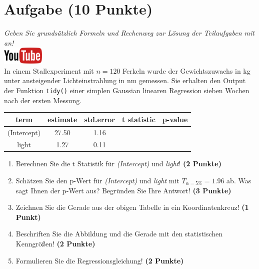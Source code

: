 \documentclass[a4paper, 10pt]{scrartcl}\usepackage[]{graphicx}\usepackage[]{xcolor}
\begin{document}
\section{Aufgabe \hfill (10 Punkte)}

\textit{Geben Sie grunds{\"a}tzlich Formeln und Rechenweg zur L{\"o}sung der
  Teilaufgaben mit an!} \\[1Ex]

\hfill\href{https://youtu.be/lJp8rFmMnrs}{\includegraphics[width =
  2cm]{img/youtube}}\\[1Ex]



In einem Stallexperiment mit $n = 120$ Ferkeln wurde der
Gewichtszuwachs in kg unter ansteigender Lichteinstrahlung in nm
gemessen. Sie erhalten den \Rlogo Output der Funktion \texttt{tidy()} einer
simplen Gaussian linearen Regression sieben Wochen nach der ersten Messung.

\begin{table}[!h]
\centering\begingroup\fontsize{14}{16}\selectfont

\begin{tabular}{ccccc}
\toprule
term & estimate & std.error & t statistic & p-value\\
\midrule
(Intercept) & 27.50 & 1.16 &  & \\
light & 1.27 & 0.11 &  & \\
\bottomrule
\end{tabular}
\endgroup{}
\end{table}



\begin{enumerate}
\item Berechnen Sie die t Statistik f{\"u}r \textit{(Intercept)} und
  \textit{light}! \textbf{(2 Punkte)}
\item Sch{\"a}tzen Sie den p-Wert f{\"u}r \textit{(Intercept)} und
  \textit{light} mit $T_{\alpha = 5\%} = 1.96$ ab. Was sagt Ihnen der p-Wert aus?
  Begr{\"u}nden Sie Ihre Antwort! \textbf{(3 Punkte)}
\item Zeichnen Sie die Gerade aus der obigen Tabelle in ein Koordinatenkreuz! \textbf{(1 Punkt)}
\item Beschriften Sie die Abbildung und die Gerade mit den statistischen
  Kenngr{\"o}{\ss}en! \textbf{(2 Punkte)}
\item Formulieren Sie die Regressionsgleichung! \textbf{(2 Punkte)}
\end{enumerate} 
\clearpage
\end{document}

